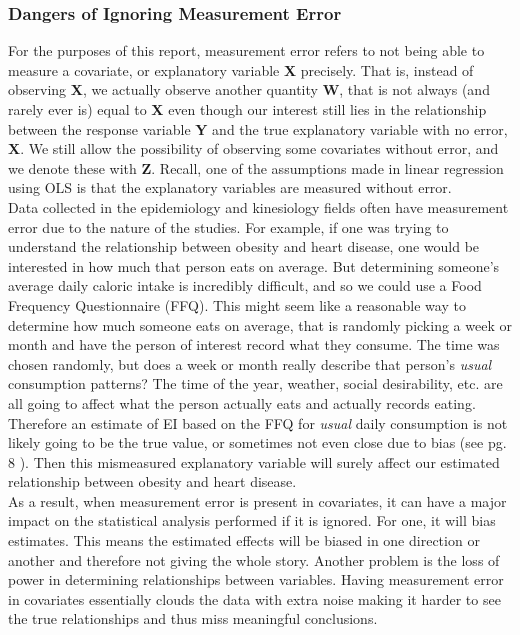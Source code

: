 \documentclass[11pt]{article}\usepackage[]{graphicx}\usepackage[]{color}
\begin{document}
\subsubsection{Dangers of Ignoring Measurement Error}

For the purposes of this report, measurement error refers to not being able to measure a covariate, or explanatory variable {\bf X} precisely. That is, instead of observing {\bf X}, we actually observe another quantity {\bf W}, that is not always (and rarely ever is) equal to {\bf X} even though our interest still lies in the relationship between the response variable {\bf Y} and the true explanatory variable with no error, {\bf X}. We still allow the possibility of observing some covariates without error, and we denote these with {\bf Z}. Recall, one of the assumptions made in linear regression using OLS is that the explanatory variables are measured without error. \\

 Data collected in the epidemiology and kinesiology fields often have measurement error due to the nature of the studies. For example, if one was trying to understand the relationship between obesity and heart disease, one would be interested in how much that person eats on average. But determining someone's average daily caloric intake is incredibly difficult, and so we could use a Food Frequency Questionnaire (FFQ). This might seem like a reasonable way to determine how much someone eats on average, that is randomly picking a week or month and have the person of interest record what they consume. The time was chosen randomly, but does a week or month really describe that person's \emph{usual} consumption patterns? The time of the year, weather, social desirability, etc. are all going to affect what the person actually eats and actually records eating. Therefore an estimate of EI based on the FFQ for \emph{usual} daily consumption is not likely going to be the true value, or sometimes not even close due to bias (see pg. 8 \cite{nonlinear}). Then this mismeasured explanatory variable will surely affect our estimated relationship between obesity and heart disease. \\


As a result, when measurement error is present in covariates, it can have a major impact on the statistical analysis performed if it is ignored. For one, it will bias estimates. This means the estimated effects will be biased in one direction or another and therefore not giving the whole story. Another problem is the loss of power in determining relationships between variables. Having measurement error in covariates essentially clouds the data with extra noise making it harder to see the true relationships and thus miss meaningful conclusions. \\
\end{document}
